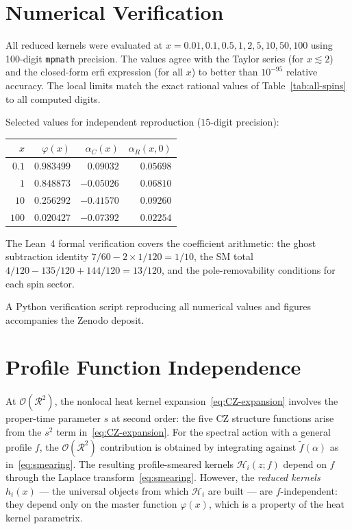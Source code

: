 \documentclass[aps,prd,twocolumn,superscriptaddress,nofootinbib,floatfix]{revtex4-2}
\theoremstyle{definition}
\theoremstyle{remark}
\begin{document}
\section{Numerical Verification}
\label{app:numerical}

All reduced kernels were evaluated at $x = 0.01, 0.1, 0.5, 1, 2, 5, 10,
50, 100$ using 100-digit \texttt{mpmath} precision. The values agree with the
Taylor series (for $x \lesssim 2$) and the closed-form erfi expression (for
all $x$) to better than $10^{-95}$ relative accuracy. The local limits match
the exact rational values of Table~\ref{tab:all-spins} to all computed digits.

Selected values for independent reproduction ($15$-digit precision):

\begin{center}
\renewcommand{\arraystretch}{1.1}
\begin{tabular}{@{}rrrr@{}}
  \toprule
  $x$ & $\varphi(x)$ & $\alpha_C(x)$ & $\alpha_R(x, 0)$ \\
  \midrule
  $0.1$ & $0.983499$ & $0.09032$ & $0.05698$ \\
  $1$ & $0.848873$ & $-0.05026$ & $0.06810$ \\
  $10$ & $0.256292$ & $-0.41570$ & $0.09260$ \\
  $100$ & $0.020427$ & $-0.07392$ & $0.02254$ \\
  \bottomrule
\end{tabular}
\end{center}

The Lean~4 formal verification covers the coefficient arithmetic: the ghost
subtraction identity $7/60 - 2 \times 1/120 = 1/10$, the SM total
$4/120 - 135/120 + 144/120 = 13/120$, and the pole-removability conditions
for each spin sector.

A Python verification script reproducing all numerical values and figures
accompanies the Zenodo deposit.


\section{Profile Function Independence}
\label{app:profile}

At $\mathcal{O}(\mathcal{R}^2)$, the nonlocal heat kernel
expansion~\eqref{eq:CZ-expansion} involves the proper-time parameter $s$ at
second order: the five CZ structure functions arise from the $s^2$ term
in~\eqref{eq:CZ-expansion}. For the spectral action with a general profile
$f$, the $\mathcal{O}(\mathcal{R}^2)$ contribution is obtained by integrating
against $\tilde{f}(\alpha)$ as in~\eqref{eq:smearing}. The resulting
profile-smeared kernels $\mathcal{H}_i(z; f)$ depend on $f$ through the
Laplace transform~\eqref{eq:smearing}. However, the \emph{reduced kernels}
$h_i(x)$ --- the universal objects from which $\mathcal{H}_i$ are built ---
are $f$-independent: they depend only on the master function $\varphi(x)$,
which is a property of the heat kernel parametrix.
\end{document}
